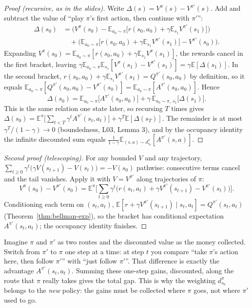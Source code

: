 \documentclass[11pt,a4paper]{article}
\newcommand{\E}{\mathbb{E}}
\newcommand{\occ}[2]{d^{#1}_{#2}}
\theoremstyle{plain}
\theoremstyle{definition}
\theoremstyle{remark}
\begin{document}
\begin{proof}[Proof (recursive, as in the slides)]
Write $\Delta(s)=V^\pi(s)-V^{\pi'}(s)$. Add and subtract the value of ``play $\pi$'s first action, then continue with $\pi'$'':
\begin{align*}
\Delta(s_0)&=\Big(V^\pi(s_0)-\E_{a_0\sim\pi}\big[r(s_0,a_0)+\gamma\E_{s_1}V^{\pi'}(s_1)\big]\Big)\\
&\quad+\Big(\E_{a_0\sim\pi}\big[r(s_0,a_0)+\gamma\E_{s_1}V^{\pi'}(s_1)\big]-V^{\pi'}(s_0)\Big).
\end{align*}
Expanding $V^\pi(s_0)=\E_{a_0\sim\pi}[r(s_0,a_0)+\gamma\E_{s_1}V^\pi(s_1)]$, the rewards cancel in the first bracket, leaving $\gamma\E_{a_0\sim\pi}\E_{s_1}[V^\pi(s_1)-V^{\pi'}(s_1)]=\gamma\E[\Delta(s_1)]$. In the second bracket, $r(s_0,a_0)+\gamma\E_{s_1}V^{\pi'}(s_1)=Q^{\pi'}(s_0,a_0)$ by definition, so it equals $\E_{a_0\sim\pi}[Q^{\pi'}(s_0,a_0)-V^{\pi'}(s_0)]=\E_{a_0\sim\pi}[A^{\pi'}(s_0,a_0)]$. Hence
\[
\Delta(s_0)=\E_{a_0\sim\pi}\big[A^{\pi'}(s_0,a_0)\big]+\gamma\,\E_{a_0\sim\pi,\,s_1}\big[\Delta(s_1)\big].
\]
This is the same relation one state later, so recursing $T$ times gives $\Delta(s_0)=\E^\pi\big[\sum_{t<T}\gamma^tA^{\pi'}(s_t,a_t)\big]+\gamma^T\E[\Delta(s_T)]$. The remainder is at most $\gamma^T/(1-\gamma)\to0$ (boundedness, L03, Lemma 3), and by the occupancy identity the infinite discounted sum equals $\frac1{1-\gamma}\E_{(s,a)\sim\occ{\pi}{s_0}}[A^{\pi'}(s,a)]$.
\end{proof}

\begin{proof}[Second proof (telescoping)]
For any bounded $V$ and any trajectory, $\sum_{t\ge0}\gamma^t\big(\gamma V(s_{t+1})-V(s_t)\big)=-V(s_0)$ pathwise: consecutive terms cancel and the tail vanishes. Apply it with $V=V^{\pi'}$ along trajectories of $\pi$:
\[
V^\pi(s_0)-V^{\pi'}(s_0)=\E^\pi\Big[\sum_{t\ge0}\gamma^t\big(r(s_t,a_t)+\gamma V^{\pi'}(s_{t+1})-V^{\pi'}(s_t)\big)\Big].
\]
Conditioning each term on $(s_t,a_t)$, $\E[r+\gamma V^{\pi'}(s_{t+1})\mid s_t,a_t]=Q^{\pi'}(s_t,a_t)$ (Theorem~\ref{thm:bellman-exp}), so the bracket has conditional expectation $A^{\pi'}(s_t,a_t)$; the occupancy identity finishes.
\end{proof}

\begin{intuition}
Imagine $\pi$ and $\pi'$ as two routes and the discounted value as the money collected. Switch from $\pi'$ to $\pi$ one step at a time: at step $t$ you compare ``take $\pi$'s action here, then follow $\pi'$'' with ``just follow $\pi'$''. That difference is exactly the advantage $A^{\pi'}(s_t,a_t)$. Summing these one-step gains, discounted, along the route that $\pi$ really takes gives the total gap. This is why the weighting $\occ{\pi}{s_0}$ belongs to the \emph{new} policy: the gains must be collected where $\pi$ goes, not where $\pi'$ used to go.
\end{intuition}
\end{document}
